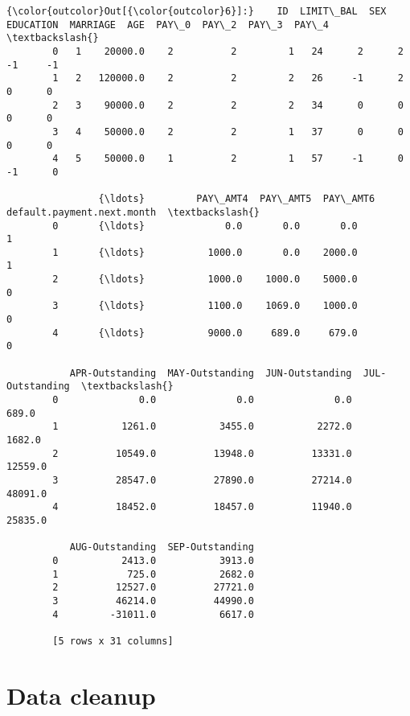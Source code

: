 \documentclass[11pt]{article}
\begin{document}
\begin{Verbatim}[commandchars=\\\{\}]
{\color{outcolor}Out[{\color{outcolor}6}]:}    ID  LIMIT\_BAL  SEX  EDUCATION  MARRIAGE  AGE  PAY\_0  PAY\_2  PAY\_3  PAY\_4  \textbackslash{}
        0   1    20000.0    2          2         1   24      2      2     -1     -1   
        1   2   120000.0    2          2         2   26     -1      2      0      0   
        2   3    90000.0    2          2         2   34      0      0      0      0   
        3   4    50000.0    2          2         1   37      0      0      0      0   
        4   5    50000.0    1          2         1   57     -1      0     -1      0   
        
                {\ldots}         PAY\_AMT4  PAY\_AMT5  PAY\_AMT6  default.payment.next.month  \textbackslash{}
        0       {\ldots}              0.0       0.0       0.0                           1   
        1       {\ldots}           1000.0       0.0    2000.0                           1   
        2       {\ldots}           1000.0    1000.0    5000.0                           0   
        3       {\ldots}           1100.0    1069.0    1000.0                           0   
        4       {\ldots}           9000.0     689.0     679.0                           0   
        
           APR-Outstanding  MAY-Outstanding  JUN-Outstanding  JUL-Outstanding  \textbackslash{}
        0              0.0              0.0              0.0            689.0   
        1           1261.0           3455.0           2272.0           1682.0   
        2          10549.0          13948.0          13331.0          12559.0   
        3          28547.0          27890.0          27214.0          48091.0   
        4          18452.0          18457.0          11940.0          25835.0   
        
           AUG-Outstanding  SEP-Outstanding  
        0           2413.0           3913.0  
        1            725.0           2682.0  
        2          12527.0          27721.0  
        3          46214.0          44990.0  
        4         -31011.0           6617.0  
        
        [5 rows x 31 columns]
\end{Verbatim}
            
    \section{Data cleanup}\label{data-cleanup}
\end{document}
